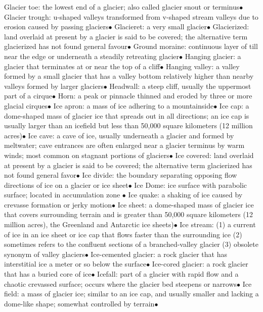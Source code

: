 \documentclass{article}
\newcommand{\ddd}{$\bullet$}
\begin{document}
\begin{multicols*}{4}
        Glacier toe: the lowest end of a glacier; also called glacier snout or terminus\ddd
        Glacier trough: u-shaped valleys transformed from v-shaped stream valleys due to erosion caused by passing glaciers\ddd
        Glacieret: a very small glacier\ddd
        Glacierized: land overlaid at present by a glacier is said to be covered; the alternative term glacierized has not found general favour\ddd
        Ground moraine: continuous layer of till near the edge or underneath a steadily retreating glacier\ddd
        Hanging glacier: a glacier that terminates at or near the top of a cliff\ddd
        Hanging valley: a valley formed by a small glacier that has a valley bottom relatively higher than nearby valleys formed by larger glaciers\ddd
        Headwall: a steep cliff, usually the uppermost part of a cirque\ddd
        Horn: a peak or pinnacle thinned and eroded by three or more glacial cirques\ddd
        Ice apron: a mass of ice adhering to a mountainside\ddd
        Ice cap: a dome-shaped mass of glacier ice that spreads out in all directions; an ice cap is usually larger than an icefield but less than 50,000 square kilometers (12 million acres)\ddd
        Ice cave: a cave of ice, usually underneath a glacier and formed by meltwater; cave entrances are often enlarged near a glacier terminus by warm winds; most common on stagnant portions of glaciers\ddd
        Ice covered: land overlaid at present by a glacier is said to be covered; the alternative term glacierized has not found general favor\ddd
        Ice divide: the boundary separating opposing flow directions of ice on a glacier or ice sheet\ddd
        Ice Dome: ice surface with parabolic surface; located in accumulation zone \ddd 
        Ice quake: a shaking of ice caused by crevasse formation or jerky motion\ddd
        Ice sheet: a dome-shaped mass of glacier ice that covers surrounding terrain and is greater than 50,000 square kilometers (12 million acres), the Greenland and Antarctic ice sheets)\ddd
        Ice stream: (1) a current of ice in an ice sheet or ice cap that flows faster than the surrounding ice (2) sometimes refers to the confluent sections of a branched-valley glacier (3) obsolete synonym of valley glaciers\ddd
        Ice-cemented glacier: a rock glacier that has interstitial ice a meter or so below the surface\ddd
        Ice-cored glacier: a rock glacier that has a buried core of ice\ddd
        Icefall: part of a glacier with rapid flow and a chaotic crevassed surface; occurs where the glacier bed steepens or narrows\ddd
        Ice field: a mass of glacier ice; similar to an ice cap, and usually smaller and lacking a dome-like shape; somewhat controlled by terrain\ddd

\end{multicols*}
\end{document}
